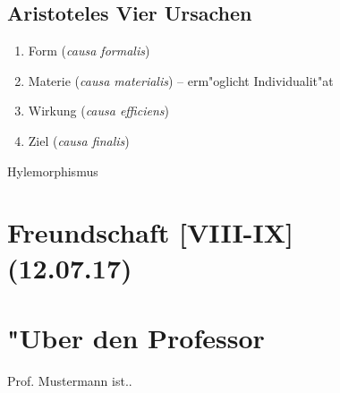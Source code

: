 \documentclass[emulatestandardclasses]{scrartcl}
\begin{document}
\subsection{Aristoteles Vier Ursachen}

\begin{enumerate}
  \item Form (\emph{causa formalis})
  \item Materie (\emph{causa materialis}) -- erm"oglicht Individualit"at
  \item Wirkung (\emph{causa efficiens})
  \item Ziel (\emph{causa finalis})
\end{enumerate}

Hylemorphismus


\section{Freundschaft [VIII-IX]\\(12.07.17)}

\begin{description}[leftmargin=!,labelwidth=\widthof{\bfseries \emph{philia}}]
  \item[\emph{philia}] 
  \item[\emph{eros}] 
  \item[\emph{agape}] 
\end{description}



\newpage
\section{"Uber den Professor}
Prof. Mustermann ist..


\end{document}
